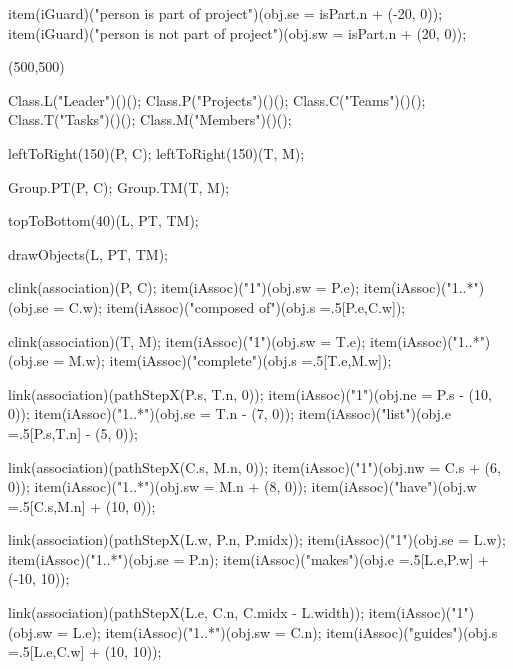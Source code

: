 \begin{empfile}
\begin{empdef}[activityR4]
item(iGuard)("person is part of project")(obj.se = isPart.n + (-20, 0));
item(iGuard)("person is not part of project")(obj.sw = isPart.n + (20, 0));
\end{empdef}

\begin{empdef}[erdiag](500,500)

Class.L("Leader")()();
Class.P("Projects")()();
Class.C("Teams")()();
Class.T("Tasks")()();
Class.M("Members")()();

leftToRight(150)(P, C);
leftToRight(150)(T, M);

Group.PT(P, C);
Group.TM(T, M);

topToBottom(40)(L, PT, TM);



drawObjects(L, PT, TM);

clink(association)(P, C);
item(iAssoc)("1")(obj.sw = P.e);
item(iAssoc)("1..*")(obj.se = C.w);
item(iAssoc)("composed of")(obj.s =.5[P.e,C.w]);

clink(association)(T, M);
item(iAssoc)("1")(obj.sw = T.e);
item(iAssoc)("1..*")(obj.se = M.w);
item(iAssoc)("complete")(obj.s =.5[T.e,M.w]);

link(association)(pathStepX(P.s, T.n, 0));
item(iAssoc)("1")(obj.ne = P.s - (10, 0));
item(iAssoc)("1..*")(obj.se = T.n - (7, 0));
item(iAssoc)("list")(obj.e =.5[P.s,T.n] - (5, 0));

link(association)(pathStepX(C.s, M.n, 0));
item(iAssoc)("1")(obj.nw = C.s + (6, 0));
item(iAssoc)("1..*")(obj.sw = M.n + (8, 0));
item(iAssoc)("have")(obj.w =.5[C.s,M.n] + (10, 0));

link(association)(pathStepX(L.w, P.n, P.midx));
item(iAssoc)("1")(obj.se = L.w);
item(iAssoc)("1..*")(obj.se = P.n);
item(iAssoc)("makes")(obj.e =.5[L.e,P.w] + (-10, 10));

link(association)(pathStepX(L.e, C.n, C.midx - L.width));
item(iAssoc)("1")(obj.sw = L.e);
item(iAssoc)("1..*")(obj.sw = C.n);
item(iAssoc)("guides")(obj.s =.5[L.e,C.w] + (10, 10));

\end{empdef}
\end{empfile}